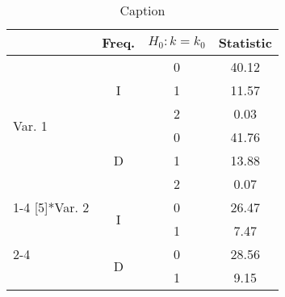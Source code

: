 \documentclass[a4paper,12pt]{article}
\begin{document}
	\begin{footnotesize}
		\begin{table}[tbph]
			\centering
			\caption{Caption} \label{tab:test}
			\begin{threeparttable}
				\begin{tabular}{lccc}
					\toprule
					& Freq. & \(H_{0}: k = k_{0}\) & Statistic \\
					\midrule
					\multirow{6}[5]{*}{Var. 1} & \multirow{3}{*}{I} & 0 & 40.12 \\
					& & 1 & 11.57 \\
					& & 2 &  0.03 \\
					\cmidrule(lr){2-4}
					& \multirow{3}{*}{D} & 0 & 41.76 \\
					& & 1 & 13.88 \\
					& & 2 &  0.07 \\
					\cmidrule(lr){1-4}
					\multirow{4}[5]{*}{Var. 2} & \multirow{2}{*}{I} & 0 & 26.47 \\
					& & 1 &  7.47 \\
					\cmidrule(lr){2-4}
					& \multirow{2}{*}{D} & 0 & 28.56 \\
					& & 1 &  9.15 \\
					\bottomrule
				\end{tabular}
			\end{threeparttable}
		\end{table}
	\end{footnotesize}
\end{document}
